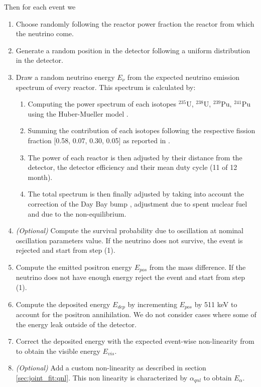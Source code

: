 \documentclass[../main.tex]{subfiles}
\begin{document}
Then for each event we
\begin{enumerate}
  \item Choose randomly following the reactor power fraction the reactor from which the neutrino come.
  \item Generate a random position in the detector following a uniform distribution in the detector.
  \item Draw a random neutrino energy $E_{\nu}$ from the expected neutrino emission spectrum of every reactor. This spectrum is calculated by:
    \begin{enumerate}
      \item Computing the power spectrum of each isotopes $^{235}$U, $^{238}$U, $^{239}$Pu, $^{241}$Pu using the Huber-Mueller model \cite{huber_determination_2011, mueller_improved_2011}.
      \item Summing the contribution of each isotopes following the respective fission fraction [0.58, 0.07, 0.30, 0.05] as reported in \cite{ma_improved_2013}.
      \item The power of each reactor is then adjusted by their distance from the detector, the detector efficiency and their mean duty cycle (11 of 12 month).
      \item The total spectrum is then finally adjusted by taking into account the correction of the Day Bay bump \cite{daya_bay_collaboration_measurement_2016}, adjustment due to spent nuclear fuel and due to the non-equilibrium.
    \end{enumerate}
  \item \textit{(Optional)} Compute the survival probability due to oscillation at nominal oscillation parameters value. If the neutrino does not survive, the event is rejected and start from step (1).
  \item Compute the emitted positron energy $E_{pos}$ from the mass difference. If the neutrino does not have enough energy reject the event and start from step (1).
  \item Compute the deposited energy $E_{dep}$ by incrementing $E_{pos}$ by 511 keV to account for the positron annihilation. We do not consider cases where some of the energy leak outside of the detector.
  \item Correct the deposited energy with the expected event-wise non-linearity from \cite{juno_collaboration_calibration_2021} to obtain the visible energy $E_{vis}$.
  \item \textit{(Optional)} Add a custom non-linearity as described in section \ref{sec:joint_fit:qnl}. This non linearity is characterized by $\alpha_{qnl}$ to obtain $E_{\alpha}$.

\end{enumerate}
\end{document}
